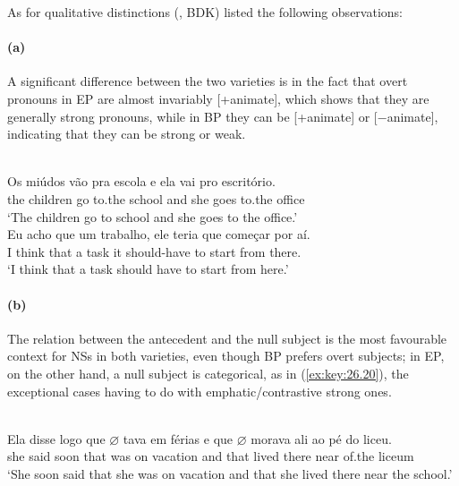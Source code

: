 \documentclass[output=paper]{langsci/langscibook}
\begin{document}
As for qualitative distinctions \citeauthor{BarbosaDuarteKato2005}
(\citeyear[19]{BarbosaDuarteKato2005}, BDK) listed the following observations:

\paragraph*{(a)} A significant difference between the two varieties is in the
fact that overt pronouns in \gls{EP} are almost
invariably [+animate], which shows that they are generally strong pronouns,
while in \gls{BP} they can be [+animate] or
[−animate], indicating that they can be strong or weak.

\ea\label{ex:key:26.19}
    \ea{}\\
	\gll	Os miúdos  vão pra     escola e     ela vai    pro      escritório.\\
			the children go    to.the school and she goes to.the   office\\
	\glt	\enquote*{The children go to      school and she goes to the office.}
    \ex{}\\
	\gll	Eu acho que um trabalho, ele teria  que começar por aí.\\
			I think   that a   task           it should-have to start       from there.\\
	\glt	\enquote*{I think that  a task should have to start from here.}
    \z
\z

\paragraph*{(b)} The  relation between the antecedent and the null
subject is the most favourable context for NSs in both varieties, even though
\gls{BP} prefers overt subjects; in
\gls{EP}, on the other hand, a null subject is
categorical, as in (\ref{ex:key:26.20}), the exceptional cases having to do with
emphatic/contrastive strong ones.

\ea%
    \label{ex:key:26.20}\\
	\gll	Ela disse logo que \textbf{$\varnothing$} tava em
    férias e que \textbf{$\varnothing$} morava ali {ao pé} do liceu.\\
            she said soon that {} was on vacation  and  that {} lived there
            near of.the liceum\\
	\glt	\enquote*{She soon said that she was on vacation and that she lived there near the school.}
\z
\end{document}
